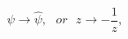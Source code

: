 \begin{equation}
\psi \longrightarrow \hat{\psi}, ~~~or~~~z \longrightarrow -\frac{1}{z},
\end{equation}

